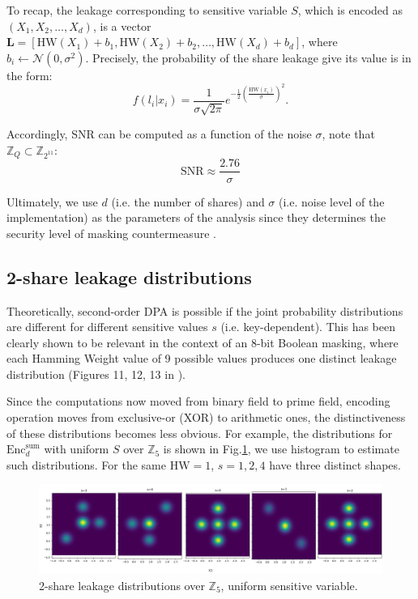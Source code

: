 \documentclass{llncs}
\begin{document}
To recap, the leakage corresponding to sensitive variable $S$, which is encoded as $(X_1, X_2, \dots, X_d)$, is a vector $\bm{L} = \left[ \text{HW}(X_1) + b_1, \text{HW}(X_2) + b_2, \dots, \text{HW}(X_d) + b_d \right] $, where $b_i \leftarrow \mathcal{N}(0, \sigma^2) $. Precisely, the probability of the share leakage give its value is in the form:
\begin{equation}\label{eq:gl}
	f(l_i|x_i) = \frac{1}{\sigma\sqrt{2\pi}} e^{ -\frac{1}{2}\left( \frac{\text{HW}(x_i)}{\sigma}\right) ^2 }.
\end{equation}

Accordingly, SNR can be computed as a function of the noise $\sigma$, note that $\mathbb{Z}_Q \subset \mathbb{Z}_{2^{11}}$:
$$\text{SNR} \approx \frac{2.76}{\sigma}$$

Ultimately, we use $d$ (i.e. the number of shares) and $\sigma$ (i.e. noise level of the implementation) as the parameters of the analysis since they determines the security level of masking countermeasure .


\subsection{2-share leakage distributions}

Theoretically, second-order DPA is possible if the joint probability distributions are different for different sensitive values $s$ (i.e. key-dependent). This has been clearly shown to be relevant in the context of an 8-bit Boolean masking, where each Hamming Weight value of 9 possible values produces one distinct leakage distribution (Figures 11, 12, 13 in \cite{2dpa}).

Since the computations now moved from binary field to prime field, encoding operation moves from exclusive-or (XOR) to arithmetic ones, the distinctiveness of these distributions becomes 
less obvious. For example, the distributions for $\text{Enc}^{\text{sum}}_{d}$ with uniform $S$ over $\mathbb{Z}_5$ is shown in Fig.\ref{fig:dist5_sum}, we use histogram to estimate such distributions. For the same $\text{HW}=1$, $s=1, 2, 4$ have three distinct shapes. 
\begin{figure}
	\vspace*{-0.0cm}
	\hspace*{0.0cm}\centering \includegraphics[width=12.0cm]{figures/5_dist_sum.png}
	\vspace*{0.3cm}
	\caption{2-share leakage distributions over $\mathbb{Z}_5$, uniform sensitive variable.}\label{fig:dist5_sum}\vspace*{-0.0cm}
\end{figure}
\end{document}
